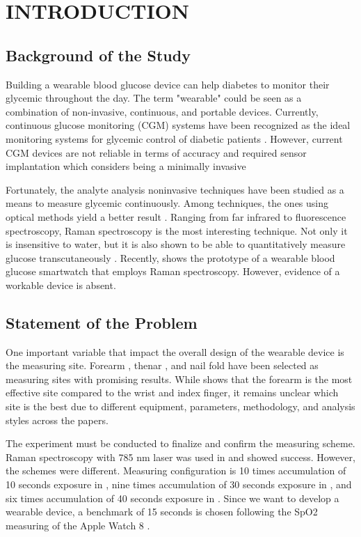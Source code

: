 \chapter{INTRODUCTION} 

\section{Background of the Study}

Building a wearable blood glucose device can help diabetes to monitor their glycemic throughout the day. 
The term "wearable" could be seen as a combination of non-invasive, continuous, and portable devices. 
Currently, continuous glucose monitoring (CGM) systems have been recognized as the ideal monitoring systems for glycemic control of diabetic patients \citep{continuous2021}.
However, current CGM devices are not reliable in terms of accuracy and required sensor implantation which considers being a minimally invasive \citep{CGMminimalinvasive}

Fortunately, the analyte analysis noninvasive techniques have been studied as a means to measure glycemic continuously. 
Among techniques, the ones using optical methods yield a better result \citep{opticalBest}.
Ranging from far infrared to fluorescence spectroscopy, Raman spectroscopy is the most interesting technique. 
Not only it is insensitive to water, but it is also shown to be able to quantitatively measure glucose transcutaneously \citep{directGlucose}.
Recently, \cite{ramanGlucoseWatch} shows the prototype of a wearable blood glucose smartwatch that employs Raman spectroscopy. 
However, evidence of a workable device is absent. 

\section{Statement of the Problem}

One important variable that impact the overall design of the wearable device is the measuring site. 
Forearm \citep{forearm2005, forearm2014}, thenar \citep{glucobeam}, and nail fold \citep{ramanNailFold2019} have been selected as measuring sites with promising results. 
While \cite{sitecompare} shows that the forearm is the most effective site compared to the wrist and index finger, it remains unclear which site is the best due to different equipment, parameters, methodology, and analysis styles across the papers.

The experiment must be conducted to finalize and confirm the measuring scheme. 
Raman spectroscopy with 785 nm laser was used in \citep{forearm2014, sitecompare, ramanNailFold2019} and showed success.
However, the schemes were different. 
Measuring configuration is 10 times accumulation of 10 seconds exposure in \cite{forearm2014}, nine times accumulation of 30 seconds exposure in \citep{sitecompare}, and six times accumulation of 40 seconds exposure in \citep{ramanNailFold2019}. 
Since we want to develop a wearable device, a benchmark of 15 seconds is chosen following the SpO2 measuring of the Apple Watch 8 \citep{applewatch}.

